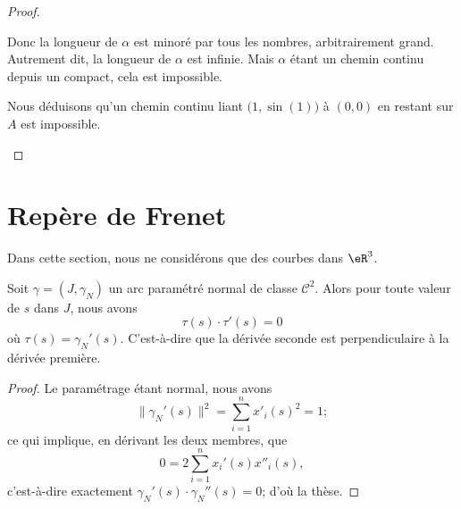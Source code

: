 \begin{proof}
\begin{subproof}
		\spitem[Conclusion]
		Donc la longueur de \( \alpha\) est minoré par tous les nombres, arbitrairement grand. Autrement dit, la longueur de \( \alpha\) est infinie. Mais \( \alpha\) étant un chemin continu depuis un compact, cela est impossible.

		Nous déduisons qu'un chemin continu liant \( \big( 1,\sin(1) \big)\) à \( (0,0)\) en restant sur \( A\) est impossible.
	\end{subproof}
\end{proof}

\section{Repère de Frenet}      \label{SecFrenet}

Dans cette section, nous ne considérons que des courbes dans \( \eR^3\).

\begin{proposition}     \label{Proptausclataupzero}
	Soit \( \gamma=(J,\gamma_N)\) un arc paramétré normal de classe \( \mathcal{C}^2\). Alors pour toute valeur de \( s\) dans \( J\), nous avons
	\begin{equation}
		\tau(s)\cdot\tau'(s)=0
	\end{equation}
	où \( \tau(s)=\gamma_N'(s)\). C'est-à-dire que la dérivée seconde est perpendiculaire à la dérivée première.
\end{proposition}

\begin{proof}
	Le paramétrage étant normal, nous avons
	\begin{equation}
		\| \gamma_N'(s) \|^2=\sum_{i=1}^nx'_i(s)^2=1;
	\end{equation}
	ce qui implique, en dérivant les deux membres, que
	\begin{equation}
		0=2\sum_{i=1}^nx_i'(s)x''_i(s),
	\end{equation}
	c'est-à-dire exactement \( \gamma_N'(s)\cdot \gamma_N''(s)=0\); d'où la thèse.
\end{proof}

